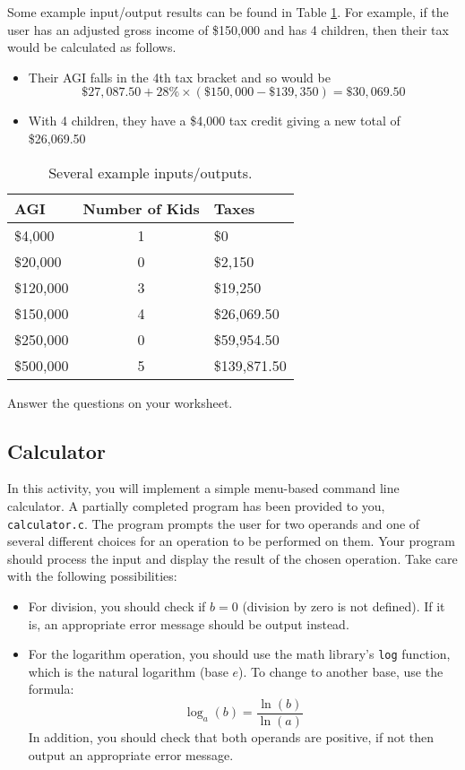 \documentclass[12pt]{scrartcl}
\begin{document}
Some example input/output results can be found in Table \ref{table:examples}.
For example, if the user has an adjusted gross income of \$150,000 and has
4 children, then their tax would be calculated as follows.
\begin{itemize}
  \item Their AGI falls in the 4th tax bracket and so would be
    $$\$27,087.50 + 28\% \times (\$150,000 - \$139,350) = \$30,069.50$$
  \item With 4 children, they have a \$4,000 tax credit giving a new total of \$26,069.50
\end{itemize}

\begin{table}
\centering
\begin{tabular}{l|c|l}
AGI & Number of Kids & Taxes \\
\hline\hline
\$4,000 & 1 & \$0 \\
\$20,000 & 0 & \$2,150 \\
\$120,000 & 3 & \$19,250 \\
\$150,000 & 4 & \$26,069.50 \\
\$250,000 & 0 & \$59,954.50 \\
\$500,000 & 5 & \$139,871.50 \\
\end{tabular}
\caption{Several example inputs/outputs.}
\label{table:examples}
\end{table}

Answer the questions on your worksheet.

\subsection{Calculator}

In this activity, you will implement a simple menu-based command line 
calculator.  A partially completed program has been provided to you, 
\texttt{calculator.c}.  The program prompts the user for two operands 
and one of several different choices for an operation to be performed on 
them.  Your program should process the input and display the result of 
the chosen operation.  Take care with the following possibilities:
\begin{itemize}
  \item For division, you should check if $b = 0$ (division by zero is not defined).  
  	If it is, an appropriate error message should be output instead.
  \item For the logarithm operation, you should use the math library's \texttt{log} 
	function, which is the natural logarithm (base $e$).  To change to another
	 base, use the formula:
	 	$$\log_a{(b)} = \frac{\ln(b)}{\ln(a)}$$
In addition, you should check that both operands are positive, if not 
then output an appropriate error message.
\end{itemize}
\end{document}
